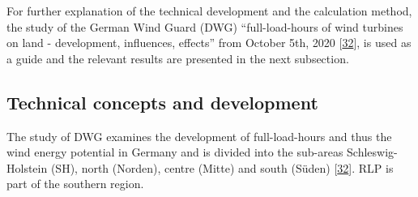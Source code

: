 \documentclass[a4paper,11pt]{article}
\begin{document}
For further explanation of the technical development and the calculation method, the study of the German Wind Guard (DWG) ``full-load-hours of wind turbines on land - development, influences, effects'' from October 5th, 2020 {[}\protect\hyperlink{ref-RasmusBorrmannDr.KnudRehfeldtDr.DennisKruse.2020}{32}{]}, is used as a guide and the relevant results are presented in the next subsection.

\hypertarget{technical-concepts-and-development}{%
\subsection{Technical concepts and development}\label{technical-concepts-and-development}}

The study of DWG examines the development of full-load-hours and thus the wind energy potential in Germany and is divided into the sub-areas Schleswig-Holstein (SH), north (Norden), centre (Mitte) and south (Süden) {[}\protect\hyperlink{ref-RasmusBorrmannDr.KnudRehfeldtDr.DennisKruse.2020}{32}{]}. RLP is part of the southern region.
\end{document}
